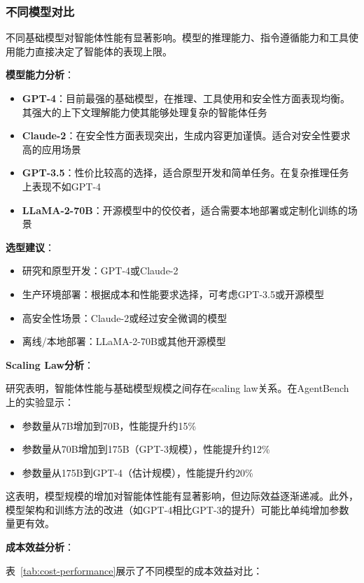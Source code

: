 \subsubsection{不同模型对比}

不同基础模型对智能体性能有显著影响。模型的推理能力、指令遵循能力和工具使用能力直接决定了智能体的表现上限。

\textbf{模型能力分析}：
\begin{itemize}[leftmargin=2em]
    \item \textbf{GPT-4}：目前最强的基础模型，在推理、工具使用和安全性方面表现均衡。其强大的上下文理解能力使其能够处理复杂的智能体任务
    \item \textbf{Claude-2}：在安全性方面表现突出，生成内容更加谨慎。适合对安全性要求高的应用场景
    \item \textbf{GPT-3.5}：性价比较高的选择，适合原型开发和简单任务。在复杂推理任务上表现不如GPT-4
    \item \textbf{LLaMA-2-70B}：开源模型中的佼佼者，适合需要本地部署或定制化训练的场景
\end{itemize}

\textbf{选型建议}：
\begin{itemize}[leftmargin=2em]
    \item 研究和原型开发：GPT-4或Claude-2
    \item 生产环境部署：根据成本和性能要求选择，可考虑GPT-3.5或开源模型
    \item 高安全性场景：Claude-2或经过安全微调的模型
    \item 离线/本地部署：LLaMA-2-70B或其他开源模型
\end{itemize}

\textbf{Scaling Law分析}：

研究表明，智能体性能与基础模型规模之间存在scaling law关系。在AgentBench上的实验显示：
\begin{itemize}[leftmargin=2em]
    \item 参数量从7B增加到70B，性能提升约15\%
    \item 参数量从70B增加到175B（GPT-3规模），性能提升约12\%
    \item 参数量从175B到GPT-4（估计规模），性能提升约20\%
\end{itemize}

这表明，模型规模的增加对智能体性能有显著影响，但边际效益逐渐递减。此外，模型架构和训练方法的改进（如GPT-4相比GPT-3的提升）可能比单纯增加参数量更有效。

\textbf{成本效益分析}：

表~\ref{tab:cost-performance}展示了不同模型的成本效益对比：

